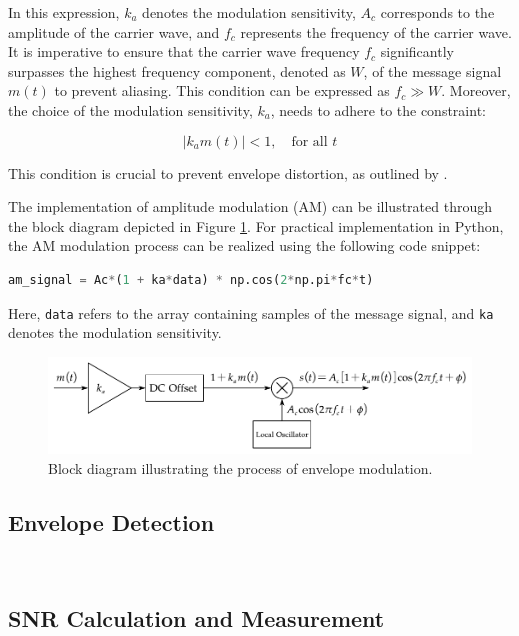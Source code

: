 \documentclass[../ECE459FinalProjectReport.tex]{subfiles}
\begin{document}
In this expression, $k_a$ denotes the modulation sensitivity, $A_c$ corresponds to the amplitude of the carrier wave, and $f_c$ represents the frequency of the carrier wave. It is imperative to ensure that the carrier wave frequency $f_c$ significantly surpasses the highest frequency component, denoted as $W$, of the message signal $m(t)$ to prevent aliasing. This condition can be expressed as $f_c \gg W$. Moreover, the choice of the modulation sensitivity, $k_a$, needs to adhere to the constraint:

\begin{equation}
    \left| k_a m(t) \right| < 1, \quad \text{for all }t
\end{equation}

This condition is crucial to prevent envelope distortion, as outlined by \textcite[pp. 101-102]{haykinIntroductionAnalogDigital2007}.

The implementation of amplitude modulation (AM) can be illustrated through the block diagram depicted in Figure \ref{fig:env-mod}. For practical implementation in Python, the AM modulation process can be realized using the following code snippet:

\begin{lstlisting}[language=python]
am_signal = Ac*(1 + ka*data) * np.cos(2*np.pi*fc*t)
\end{lstlisting}

Here, \verb|data| refers to the array containing samples of the message signal, and \verb|ka| denotes the modulation sensitivity.

\begin{figure}[b]
    \centering
    \includegraphics[scale=0.7]{plots/env_mod.pdf}
    \caption{Block diagram illustrating the process of envelope modulation.}
    \label{fig:env-mod}
\end{figure}

\subsection{Envelope Detection}
~
\subsection{SNR Calculation and Measurement}
~
\end{document}
